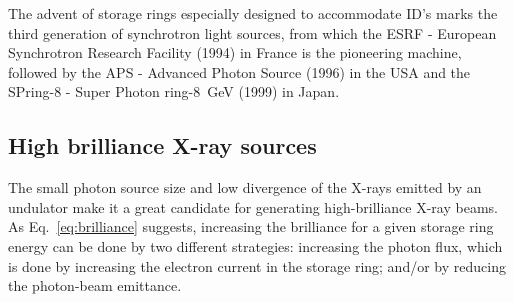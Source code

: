 \begin{refsection}
The advent of storage rings especially designed to accommodate ID's marks the third generation of synchrotron light sources, from which the ESRF - European Synchrotron Research Facility (1994) in France is the pioneering machine, followed by the APS - Advanced Photon Source (1996) in the USA and the SPring-8 - Super Photon ring-8~GeV (1999) in Japan.%

\subsection{High brilliance X-ray sources}\label{sec:brilliance}

The small photon source size and low divergence of the X-rays emitted by an undulator make it a great candidate for generating high-brilliance X-ray beams. As Eq.~\ref{eq:brilliance} suggests, increasing the brilliance for a given storage ring energy can be done by two different strategies: increasing the photon flux, which is done by increasing the electron current in the storage ring; and/or by reducing the photon-beam emittance.


\end{refsection}
